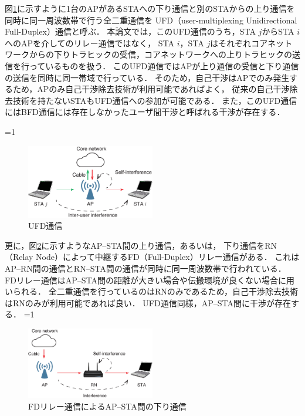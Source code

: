\documentclass[master]{kuisthesis}		%
\newcounter{flagFig}
\begin{document}
			\par
			図\ref{fig:model_ufd}に示すように1台のAPがあるSTAへの下り通信と別のSTAからの上り通信を同時に同一周波数帯で行う全二重通信を
			UFD（user-multiplexing Unidirectional Full-Duplex）通信と呼ぶ．
			本論文では，このUFD通信のうち，STA $j$からSTA $i$へのAPを介してのリレー通信ではなく，
			STA $i$，STA $j$はそれぞれコアネットワークからの下りトラヒックの受信，コアネットワークへの上りトラヒックの送信を行っているものを扱う．
			このUFD通信ではAPが上り通信の受信と下り通信の送信を同時に同一帯域で行っている．
			そのため，自己干渉はAPでのみ発生するため，APのみ自己干渉除去技術が利用可能であればよく，
			従来の自己干渉除去技術を持たないSTAもUFD通信への参加が可能である．
			また，このUFD通信にはBFD通信には存在しなかったユーザ間干渉と呼ばれる干渉が存在する．

			\ifnum\value{flagFig}=1 {\begin{figure}[htbp]
				\begin{center}
					\includegraphics[width=0.5\textwidth]{fig/ufd.eps}
					\caption{UFD通信}
					\label{fig:model_ufd}
				\end{center}
			\end{figure}}\fi
			\par
			更に，図\ref{fig:model_relay}に示すようなAP--STA間の上り通信，あるいは，
			下り通信をRN（Relay Node）によって中継するFD（Full-Duplex）リレー通信がある．
			これはAP--RN間の通信とRN--STA間の通信が同時に同一周波数帯で行われている．
			FDリレー通信はAP--STA間の距離が大きい場合や伝搬環境が良くない場合に用いられる．
			全二重通信を行っているのはRNのみであるため，自己干渉除去技術はRNのみが利用可能であれば良い．
			UFD通信同様，AP--STA間に干渉が存在する．
			\ifnum\value{flagFig}=1 {\begin{figure}[htbp]
				\begin{center}
					\includegraphics[width=0.5\textwidth]{fig/model_relay.eps}
					\caption{FDリレー通信によるAP--STA間の下り通信}
					\label{fig:model_relay}
				\end{center}
			\end{figure}}\fi
\end{document}
